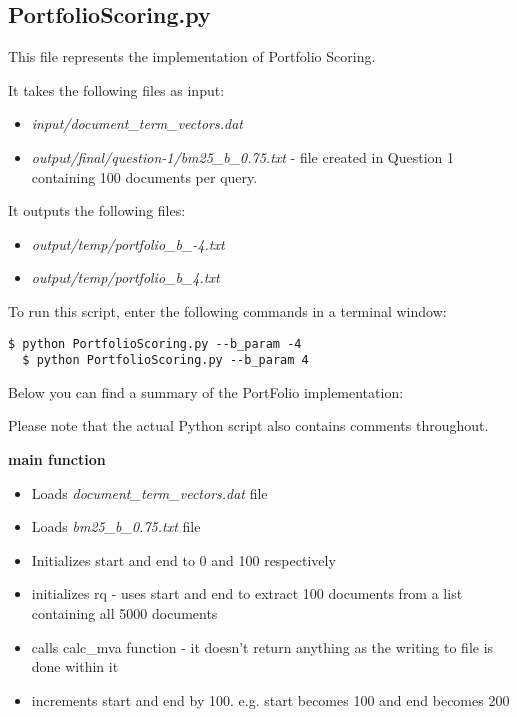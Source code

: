 \documentclass{article} %
\begin{document}
\subsection*{PortfolioScoring.py \cite{markowitz1952portfolio} \cite{wang2009portfolio} \cite{pearsoncorrelationcoefficient}}

This file represents the implementation of Portfolio Scoring.

It takes the following files as input:

\begin{itemize}
    \item \textit{input/document\_term\_vectors.dat}
    \item \textit{output/final/question-1/bm25\_b\_0.75.txt} - file created in Question 1 containing 100 documents per query.
\end{itemize}

It outputs the following files:

\begin{itemize}
    \item \textit{output/temp/portfolio\_b\_-4.txt}
    \item \textit{output/temp/portfolio\_b\_4.txt}
\end{itemize}

To run this script, enter the following commands in a terminal window:

\begin{lstlisting}[style=Bash]
  $ python PortfolioScoring.py --b_param -4
  $ python PortfolioScoring.py --b_param 4
\end{lstlisting}

Below you can find a summary of the PortFolio implementation:

Please note that the actual Python script also contains comments throughout.

\textbf{main function}

\begin{itemize}
    \item Loads \textit{document\_term\_vectors.dat} file
    \item Loads \textit{bm25\_b\_0.75.txt} file
    \item Initializes start and end to 0 and 100 respectively
    \item initializes rq - uses start and end to extract 100 documents from a list containing all 5000 documents
    \item calls calc\_mva function - it doesn't return anything as the writing to file is done within it
    \item increments start and end by 100. e.g. start becomes 100 and end becomes 200
\end{itemize}
\end{document}
